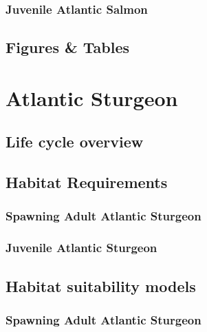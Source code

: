 \documentclass[
]{book}
\begin{document}
\hypertarget{juvenile-atlantic-salmon-1}{%
\subsection{Juvenile Atlantic Salmon}\label{juvenile-atlantic-salmon-1}}

\hypertarget{figures-tables-3}{%
\section{Figures \& Tables}\label{figures-tables-3}}

\hypertarget{atlantic-sturgeon}{%
\chapter{Atlantic Sturgeon}\label{atlantic-sturgeon}}

\hypertarget{life-cycle-overview-4}{%
\section{Life cycle overview}\label{life-cycle-overview-4}}

\hypertarget{habitat-requirements-4}{%
\section{Habitat Requirements}\label{habitat-requirements-4}}

\hypertarget{spawning-adult-atlantic-sturgeon}{%
\subsection{Spawning Adult Atlantic Sturgeon}\label{spawning-adult-atlantic-sturgeon}}

\hypertarget{juvenile-atlantic-sturgeon}{%
\subsection{Juvenile Atlantic Sturgeon}\label{juvenile-atlantic-sturgeon}}

\hypertarget{habitat-suitability-models-4}{%
\section{Habitat suitability models}\label{habitat-suitability-models-4}}

\hypertarget{spawning-adult-atlantic-sturgeon-1}{%
\subsection{Spawning Adult Atlantic Sturgeon}\label{spawning-adult-atlantic-sturgeon-1}}
\end{document}
